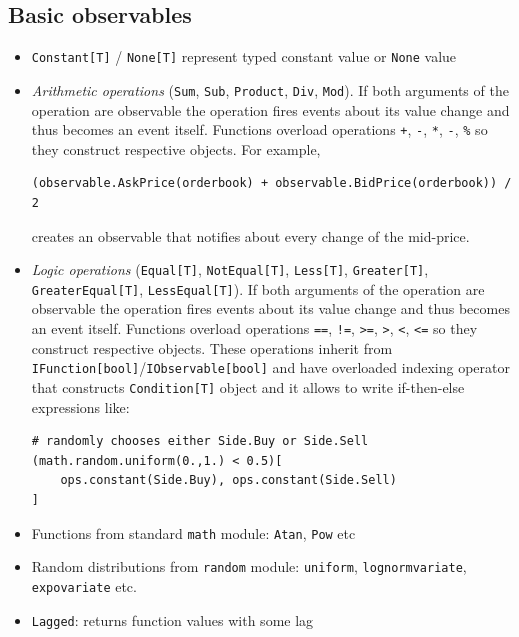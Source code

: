 \documentclass[a4paper,11pt]{article}
\begin{document}
\subsection{Basic observables}\label{basic-observables}

\begin{itemize}
\item
  \texttt{Constant{[}T{]}} / \texttt{None{[}T{]}} represent typed
  constant value or \texttt{None} value
\item
  \emph{Arithmetic operations} (\texttt{Sum}, \texttt{Sub}, \texttt{Product},
  \texttt{Div}, \texttt{Mod}). If both arguments of the operation are
  observable the operation fires events about its value change and thus
  becomes an event itself. Functions overload operations \texttt{+},
  \texttt{-}, \texttt{*}, \texttt{-}, \texttt{\%} so they construct
  respective objects. For example,
  \begin{verbatim}
(observable.AskPrice(orderbook) + observable.BidPrice(orderbook)) / 2  
  \end{verbatim}
  creates an observable that notifies about every change of the
  mid-price.
\item
  \emph{Logic operations} (\texttt{Equal{[}T{]}}, \texttt{NotEqual{[}T{]}},
  \texttt{Less{[}T{]}}, \texttt{Greater{[}T{]}},
  \texttt{GreaterEqual{[}T{]}}, \texttt{LessEqual{[}T{]}}). If both
  arguments of the operation are observable the operation fires events
  about its value change and thus becomes an event itself. Functions
  overload operations \texttt{==}, \texttt{!=}, \texttt{\textgreater{}=}, \texttt{\textgreater{}}, \texttt{\textless{}}, \texttt{\textless{}=} so they construct
  respective objects. These operations inherit from
  \texttt{IFunction{[}bool{]}}/\texttt{IObservable{[}bool{]}} and have
  overloaded indexing operator that constructs \texttt{Condition{[}T{]}}
  object and it allows to write if-then-else expressions like:

\begin{verbatim}
# randomly chooses either Side.Buy or Side.Sell
(math.random.uniform(0.,1.) < 0.5)[ 
    ops.constant(Side.Buy), ops.constant(Side.Sell) 
]
\end{verbatim}
\item
  Functions from standard \texttt{math} module: \texttt{Atan},
  \texttt{Pow} etc
\item
  Random distributions from \texttt{random} module: \texttt{uniform},
  \texttt{lognormvariate}, \texttt{expovariate} etc.
\item
  \texttt{Lagged}: returns function values with some lag


\end{itemize}
\end{document}

